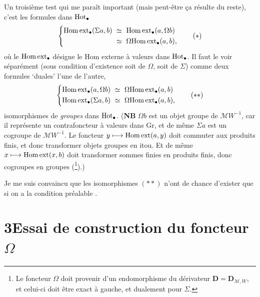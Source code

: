 Un troisième test  qui me paraît important (mais peut-être ça résulte du reste), c'est les formules dans $\mathrm{Hot}_\bullet$
\[
\left\{
\begin{aligned}
\mathrm{Hom\,ext}_\bullet(\Sigma a, b) \ &\simeq\ \mathrm{Hom\,ext}_\bullet(a, \Omega b)\\
&\simeq\ \Omega\mathrm{Hom\,ext}_\bullet(a, b),
\end{aligned}
\right.
\tag*{$(*)$}
\]
où le $\mathrm{Hom\,ext}_\bullet$ désigne le Hom externe à valeurs dans $\mathrm{Hot}_\bullet$. Il faut le voir séparément (sous condition d'existence soit de $\Omega$, soit de $\Sigma$) comme deux formules `duales' l'une de l'autre,
\[
\left\{
\begin{aligned}
\mathrm{Hom\,ext}_\bullet(a, \Omega b) \ &\simeq\ \Omega\mathrm{Hom\,ext}_\bullet(a, b)\\
\mathrm{Hom\,ext}_\bullet(\Sigma a, b) \ &\simeq\ \Omega\mathrm{Hom\,ext}_\bullet(a, b),
\end{aligned}
\right.
\tag*{$(**)$}
\]
isomorphismes de \textit{groupes} dans $\mathrm{Hot}_\bullet$. (\textbf{NB} $\Omega b$ est un objet groupe de $\mathcal{M}W^{-1}$, car il représente un contrafoncteur à valeurs dans Gr, et de même $\Sigma a$ est un cogroupe de $\mathcal{M}W^{-1}$. Le foncteur $y \longmapsto \mathrm{Hom\,ext}(a, y)$ doit commuter aux produits finis, et donc transformer objets groupes en itou. Et de même $x \longmapsto \mathrm{Hom\,ext}(x, b)$ doit transformer sommes finies en produits finis, donc cogroupes en groupes (\footnote[8]{Le foncteur $\Omega$ doit provenir d'un endomorphisme du dérivateur $\mathbf{D} = \mathbf{D}_{\mathcal{M},W}$, et celui-ci doit être exact à gauche, et dualement pour $\Sigma$.}).)

Je me suis convaincu que les isomorphismes $(**)$ n'ont de chance d'exister que si on a la condition préalable .

\newpage



\section*{3\quad Essai de construction du foncteur $\Omega$}

